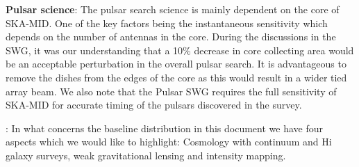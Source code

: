 \documentclass[sfheadings,a4paper,times,9pt,floats,floatfix]{article}
\begin{document}
{\bf Pulsar science}: The pulsar search science is mainly dependent on
the core of SKA-MID. One of the key factors being the instantaneous sensitivity which depends on the number of antennas
in the core. During the discussions in the SWG, it was our understanding that a 10\% decrease in core collecting area would be
an acceptable perturbation in the overall pulsar search. It is advantageous to remove the dishes from the edges of the
core as this would result in a wider tied array beam. We also note that the Pulsar SWG requires the full sensitivity of
SKA-MID for accurate timing of the pulsars discovered in the survey.

\smallskip
{}: In what concerns the baseline distribution in this document we have four
aspects which we would like to highlight: Cosmology with continuum and
H{\sc i} galaxy surveys, weak
gravitational lensing and intensity mapping.\\
\end{document}
